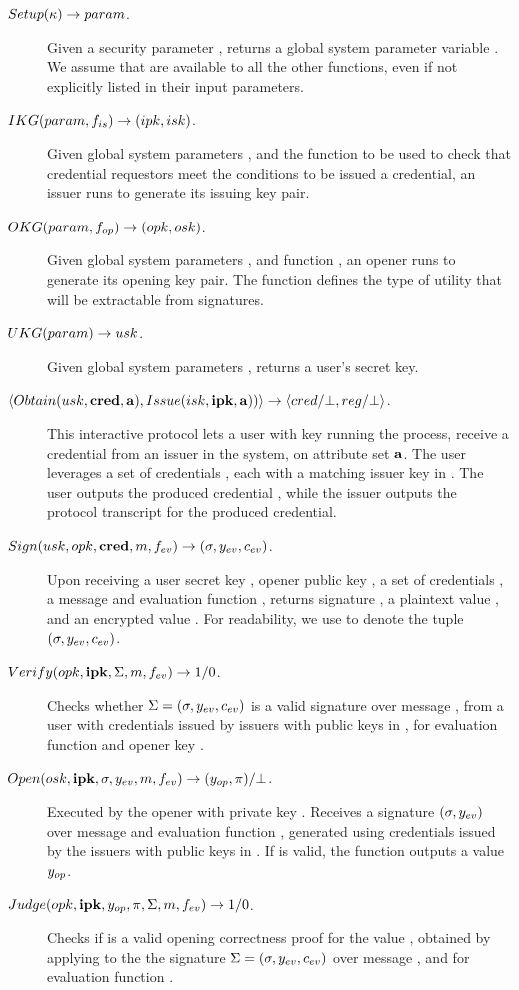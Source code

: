 \begin{description}
\item[$Setup(\kappa) \rightarrow param$.] Given a security parameter \secpar,
  returns a global system parameter variable \parm. We assume that \parm are
  available to all the other functions, even if not explicitly listed in their
  input parameters.
\item[$IKG(param,f_{is}) \rightarrow (ipk,isk)$.] Given global system
  parameters \parm, and the function \fissue to be used to check that credential
  requestors meet the conditions to be issued a credential, an issuer runs
  \IKeyGen to generate its issuing key pair. 
\item[$OKG(param,f_{op}) \rightarrow (opk,osk)$.] Given global system
  parameters \parm, and function \finsp, an opener runs \OKeyGen to generate
  its opening key pair. The function \finsp defines the type of utility that
  will be extractable from signatures.
\item[$UKG(param) \rightarrow usk$.] Given global system parameters
  \parm, returns a user's secret key.
\item[$\langle
  Obtain(usk,\mathbf{cred},\mathbf{a}),
  Issue(isk,\mathbf{ipk},\mathbf{a}))
  \rangle \rightarrow \langle cred/\bot,reg/\bot \rangle$.] %
  This interactive protocol lets a user with key \usk running the
  \Obtain process, receive a credential \cred from an issuer in the system, on
  attribute set $\mathbf{a}$. The user leverages a set of credentials \scred,
  each with a matching issuer key in \sipk.
  The user outputs the produced credential \cred, while
  the issuer outputs the protocol transcript \utrans for the produced
  credential.
\item[$Sign(usk,opk,\mathbf{cred},m,f_{ev}) \rightarrow (\sigma,y_{ev},c_{ev})$.] %
  Upon receiving a user secret key \usk, opener public key \opk, a set of
  credentials \scred, a message \msg and evaluation
  function \feval, returns signature \sig, a plaintext value \yeval,
  and an encrypted value \ceval. For readability, we use \Sig to denote
  the tuple $(\sigma,y_{ev},c_{ev})$.
\item[$Verify(opk, \mathbf{ipk},\Sigma,m,f_{ev}) \rightarrow 1/0$.]
  Checks whether $\Sigma = (\sigma,y_{ev},c_{ev})$ is a valid signature
  over message \msg, from a user with credentials issued by issuers with public
  keys in \sipk, for evaluation function \feval and opener key \opk.
\item[$Open(osk,\mathbf{ipk},\sigma,y_{ev},m,f_{ev}) \rightarrow
  (y_{op},\pi)/\bot$.]
  Executed by the opener with private key \osk. Receives a signature $(\sigma,
  y_{ev})$ over message \msg and evaluation function \feval, generated using
  credentials issued by the issuers with public keys in \sipk. If \sig is valid,
  the function outputs a value $y_{op}$.
\item[$Judge(opk,\mathbf{ipk},y_{op},\pi,\Sigma,m,f_{ev}) \rightarrow 1/0$.] %
  Checks if \iproof is a valid opening correctness proof for the value \yinsp,
  obtained by applying \Open to the the signature $\Sigma = (\sigma,y_{ev},c_{ev})$
  over message \msg, and for evaluation function \feval. 
\end{description}

